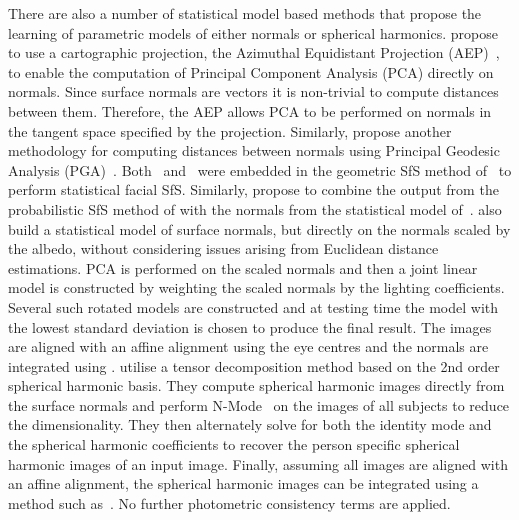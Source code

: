 There are also a number of statistical model based methods that propose the
learning of parametric models of either normals or spherical harmonics.
\citet{smith2006recovering} propose to use a cartographic projection, the
Azimuthal Equidistant Projection (AEP)~\cite{snyder1987map}, to enable
the computation of Principal Component Analysis (PCA) directly on normals. Since
surface normals are vectors it is non-trivial to compute distances between
them. Therefore, the AEP allows PCA to be performed on normals in the tangent
space specified by the projection. Similarly, \citet{smith2008facial} propose
another methodology for computing distances between normals using
Principal Geodesic Analysis (PGA)~\cite{fletcher2004principal}.
Both~\cite{smith2006recovering} and~\cite{smith2008facial} were embedded
in the geometric SfS method of~\cite{worthington1999new} to perform statistical
facial SfS. Similarly, \citet{Ahmad:2011kh} propose to combine the output
from the probabilistic SfS method of \citet{haines2008belief} with the
normals from the statistical model of~\cite{smith2008facial}.
\citet{minsik2009facial} also build a statistical model of surface normals,
but directly on the normals scaled by the albedo, without considering issues
arising from Euclidean distance estimations. PCA is performed on the scaled
normals and then a joint linear model is constructed by weighting the scaled
normals by the lighting coefficients. Several such rotated models are
constructed and at testing time the model with the lowest standard
deviation is chosen to produce the final result. The images are aligned
with an affine alignment using the eye centres and the normals are integrated
using \citet{frankot1988method}.
\cite{minsik2011fast} utilise a tensor decomposition method based on the
2nd order spherical harmonic basis. They compute spherical harmonic
images directly from the surface normals and perform
N-Mode~\cite{vasilescu2003multilinear} on the images of all subjects
to reduce the dimensionality. They then alternately solve for both the
identity mode and the spherical harmonic coefficients to recover the person
specific spherical harmonic images of an input image. Finally, assuming
all images are aligned with an affine alignment, the spherical harmonic
images can be integrated using a method such as~\citet{frankot1988method}.
No further photometric consistency terms are applied.

